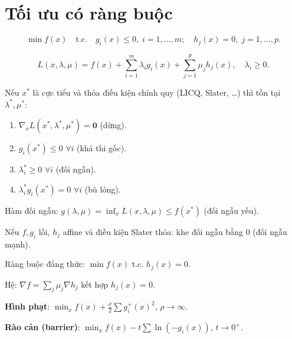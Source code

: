 \documentclass[12pt,a4paper]{article}
\begin{document}
\section{Tối ưu có ràng buộc}

\begin{dinhnghia}[title={Bài toán tổng quát}]
  \[
    \min f(x) \quad \text{t.c.} \quad g_i(x) \le 0,\; i=1,\ldots,m; \quad h_j(x) = 0,\; j=1,\ldots,p.
  \]
\end{dinhnghia}

\begin{dinhnghia}[title={Hàm Lagrange}]
  \[
    L(x, \lambda, \mu) = f(x) + \sum_{i=1}^{m}\lambda_i g_i(x) + \sum_{j=1}^{p}\mu_j h_j(x), \quad \lambda_i \ge 0.
  \]
\end{dinhnghia}

\begin{dinhly}[title={Điều kiện KKT (Karush--Kuhn--Tucker)}]
  Nếu $x^*$ là cực tiểu và thỏa điều kiện chính quy (LICQ, Slater, \ldots) thì tồn tại $\lambda^*, \mu^*$:
  \begin{enumerate}
    \item $\nabla_x L(x^*, \lambda^*, \mu^*) = \mathbf{0}$ \quad (dừng).
    \item $g_i(x^*) \le 0$ $\forall i$ \quad (khả thi gốc).
    \item $\lambda_i^* \ge 0$ $\forall i$ \quad (đối ngẫu).
    \item $\lambda_i^* g_i(x^*) = 0$ $\forall i$ \quad (bù lỏng).
  \end{enumerate}
\end{dinhly}

\begin{dinhly}[title={Đối ngẫu Lagrange}]
  Hàm đối ngẫu: $g(\lambda, \mu) = \inf_x L(x, \lambda, \mu) \le f(x^*)$ (đối ngẫu yếu).

  Nếu $f, g_i$ lồi, $h_j$ affine và điều kiện Slater thỏa: khe đối ngẫu bằng 0 (đối ngẫu mạnh).
\end{dinhly}

\begin{phuongphap}[title={Phương pháp nhân tử Lagrange}]
  Ràng buộc đẳng thức: $\min f(x)$ t.c. $h_j(x) = 0$.

  Hệ: $\nabla f = \sum_j \mu_j \nabla h_j$ kết hợp $h_j(x) = 0$.
\end{phuongphap}

\begin{phuongphap}[title={Phương pháp hình phạt và rào cản}]
  \textbf{Hình phạt}: $\min_x f(x) + \frac{\rho}{2}\sum g_i^+(x)^2$, $\rho \to \infty$.

  \textbf{Rào cản (barrier)}: $\min_x f(x) - t\sum \ln(-g_i(x))$, $t \to 0^+$.
\end{phuongphap}
\end{document}

